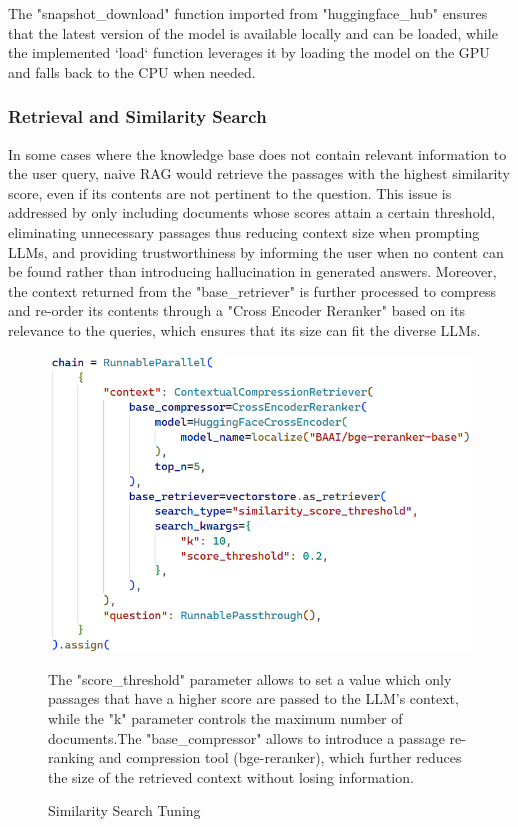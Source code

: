 The "snapshot\_download" function imported from "huggingface\_hub" ensures that the latest version of the model is available locally and can be loaded, while the implemented `load` function leverages it by loading the model on the GPU and falls back to the CPU when needed.\newpage
\subsubsection{Retrieval and Similarity Search}
In some cases where the knowledge base does not contain relevant information to the user query, naive RAG would retrieve the passages with the highest similarity score, even if its contents are not pertinent to the question. This issue is addressed by only including documents whose scores attain a certain threshold, eliminating unnecessary passages thus reducing context size when prompting LLMs, and providing trustworthiness by informing the user when no content can be found rather than introducing hallucination in generated answers.\newline
Moreover, the context returned from the "base\_retriever" is further processed to compress and re-order its contents through a "Cross Encoder Reranker" based on its relevance to the queries, which ensures that its size can fit the diverse LLMs.
\begin{figure}[htbp]
    \centering
    \includegraphics[width=.9\linewidth]{./figures/similarity_search_threshold.png}
    \caption{Similarity Search Tuning}
    \begin{flushleft}
        \small The "score\_threshold" parameter allows to set a value which only passages that have a higher score are passed to the LLM's context, while the "k" parameter controls the maximum number of documents.\newline The "base\_compressor" allows to introduce a passage re-ranking and compression tool (bge-reranker), which further reduces the size of the retrieved context without losing information.
    \end{flushleft}
\end{figure}\newline

